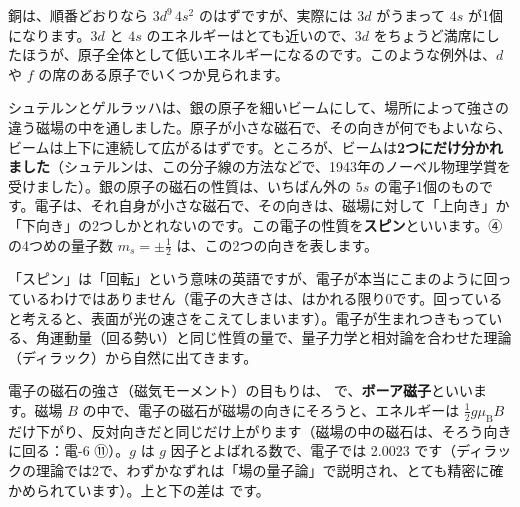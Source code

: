 \noindent 銅は、順番どおりなら $3d^9\,4s^2$ のはずですが、実際には $3d$ がうまって $4s$ が1個になります。$3d$ と $4s$ のエネルギーはとても近いので、$3d$ をちょうど満席にしたほうが、原子全体として低いエネルギーになるのです。このような例外は、$d$ や $f$ の席のある原子でいくつか見られます。

\label{ph:原-7:sec6}
シュテルンとゲルラッハは、銀の原子を細いビームにして、場所によって強さの違う磁場の中を通しました。原子が小さな磁石で、その向きが何でもよいなら、ビームは上下に連続して広がるはずです。ところが、ビームは\textbf{2つにだけ分かれました}（シュテルンは、この分子線の方法などで、1943年のノーベル物理学賞を受けました）。銀の原子の磁石の性質は、いちばん外の $5s$ の電子1個のものです。電子は、それ自身が小さな磁石で、その向きは、磁場に対して「上向き」か「下向き」の2つしかとれないのです。この電子の性質を\textbf{スピン}といいます。④の4つめの量子数 $m_s=\pm\tfrac12$ は、この2つの向きを表します。

「スピン」は「回転」という意味の英語ですが、電子が本当にこまのように回っているわけではありません（電子の大きさは、はかれる限り0です。回っていると考えると、表面が光の速さをこえてしまいます）。電子が生まれつきもっている、角運動量（回る勢い）と同じ性質の量で、量子力学と相対論を合わせた理論（ディラック）から自然に出てきます。

電子の磁石の強さ（磁気モーメント）の目もりは、
で、\textbf{ボーア磁子}といいます。磁場 $B$ の中で、電子の磁石が磁場の向きにそろうと、エネルギーは $\tfrac12g\mu_{\mathrm B}B$ だけ下がり、反対向きだと同じだけ上がります（磁場の中の磁石は、そろう向きに回る：電-6 ⑪）。$g$ は $g$ 因子とよばれる数で、電子では 2.0023 です（ディラックの理論では2で、わずかなずれは「場の量子論」で説明され、とても精密に確かめられています）。上と下の差は
\label{ph:原-7:zeeman}です。

